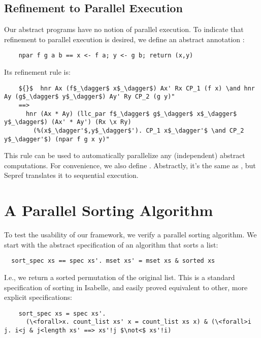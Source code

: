 \documentclass[sn-mathphys,Numbered]{sn-jnl}
\theoremstyle{thmstyleone}%
\theoremstyle{definition}%
\theoremstyle{thmstylethree}%
\begin{document}
  \subsection{Refinement to Parallel Execution}
  Our abstract programs have no notion of parallel execution.
  To indicate that refinement to parallel execution is desired, we define an abstract annotation
  :
  \begin{lstlisting}
    npar f g a b == x <- f a; y <- g b; return (x,y)
  \end{lstlisting}
  Its refinement rule is:
  \begin{lstlisting}
    ${}$  hnr Ax (f$_\dagger$ x$_\dagger$) Ax' Rx CP_1 (f x) \and hnr Ay (g$_\dagger$ y$_\dagger$) Ay' Ry CP_2 (g y)"
    ==>
      hnr (Ax * Ay) (llc_par f$_\dagger$ g$_\dagger$ x$_\dagger$ y$_\dagger$) (Ax' * Ay') (Rx \x Ry)
        (%(x$_\dagger'$,y$_\dagger$'). CP_1 x$_\dagger'$ \and CP_2 y$_\dagger'$) (npar f g x y)"
  \end{lstlisting}
  This rule can be used to automatically parallelize any (independent) abstract computations.
  For convenience, we also define . Abstractly, it's the same as ,
  but Sepref translates it to sequential execution.


  \section{A Parallel Sorting Algorithm}\label{sec:parsort}
  To test the usability of our framework, we verify a parallel sorting algorithm.
  We start with the abstract specification of an algorithm that sorts a list:
  \begin{lstlisting}
  sort_spec xs == spec xs'. mset xs' = mset xs & sorted xs
  \end{lstlisting}
  I.e., we return a sorted permutation of the original list.
  This is a standard specification of sorting in Isabelle, and easily proved equivalent to other, more explicit specifications:
  \begin{lstlisting}
    sort_spec xs = spec xs'.
      (\<forall>x. count_list xs' x = count_list xs x) & (\<forall>i j. i<j & j<length xs' ==> xs'!j $\not<$ xs'!i)
  \end{lstlisting}
\end{document}
